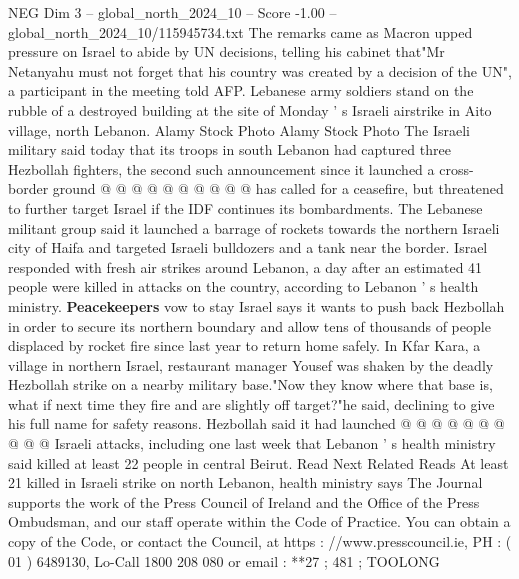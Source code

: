 \begin{textsample}{NEG Dim 3 – global\_north\_2024\_10 – Score -1.00 – global\_north\_2024\_10/115945734.txt}
The remarks came as Macron upped pressure on Israel to abide by UN decisions, telling his cabinet that"Mr Netanyahu must not forget that his country was created by a decision of the UN", a participant in the meeting told AFP.
Lebanese army soldiers stand on the rubble of a destroyed building at the site of Monday ' s Israeli airstrike in Aito village, north Lebanon.
Alamy Stock Photo Alamy Stock Photo The Israeli military said today that its troops in south Lebanon had captured three Hezbollah fighters, the second such announcement since it launched a cross-border ground @ @ @ @ @ @ @ @ @ @ has called for a ceasefire, but threatened to further target Israel if the IDF continues its bombardments.
The Lebanese militant group said it launched a barrage of rockets towards the northern Israeli city of Haifa and targeted Israeli bulldozers and a tank near the border.
Israel responded with fresh air strikes around Lebanon, a day after an estimated 41 people were killed in attacks on the country, according to Lebanon ' s health ministry. \textbf{Peacekeepers} vow to stay Israel says it wants to push back Hezbollah in order to secure its northern boundary and allow tens of thousands of people displaced by rocket fire since last year to return home safely.
In Kfar Kara, a village in northern Israel, restaurant manager Yousef was shaken by the deadly Hezbollah strike on a nearby military base."Now they know where that base is, what if next time they fire and are slightly off target?"he said, declining to give his full name for safety reasons.
Hezbollah said it had launched @ @ @ @ @ @ @ @ @ @ Israeli attacks, including one last week that Lebanon ' s health ministry said killed at least 22 people in central Beirut.
Read Next Related Reads At least 21 killed in Israeli strike on north Lebanon, health ministry says The Journal supports the work of the Press Council of Ireland and the Office of the Press Ombudsman, and our staff operate within the Code of Practice.
You can obtain a copy of the Code, or contact the Council, at https : //www.presscouncil.ie, PH : ( 01 ) 6489130, Lo-Call 1800 208 080 or email : **27 ; 481 ; TOOLONG

\end{textsample}
